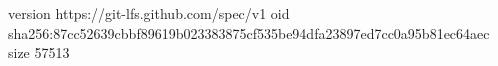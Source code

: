 version https://git-lfs.github.com/spec/v1
oid sha256:87cc52639cbbf89619b023383875cf535be94dfa23897ed7cc0a95b81ec64aec
size 57513
